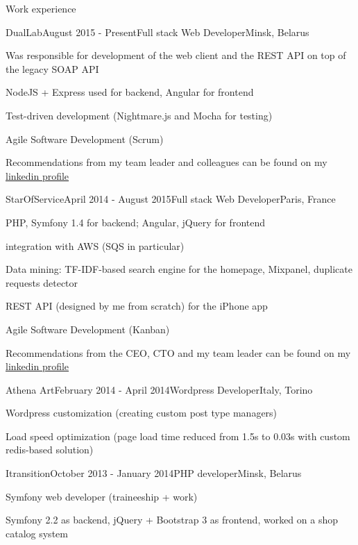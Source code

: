 \documentclass{resume} %
\begin{document}

\begin{rSection}{Work experience}

\begin{rSubsection}{DualLab}{August 2015 - Present}{Full stack Web Developer}{Minsk, Belarus}
\item Was responsible for development of the web client and the REST API on top of the legacy SOAP API
\item NodeJS + Express used for backend, Angular for frontend 
\item Test-driven development (Nightmare.js and Mocha for testing)
\item Agile Software Development (Scrum)
\item Recommendations from my team leader and colleagues can be found on my \href{http://linkedin.com/in/mikhalchenkoa}{linkedin profile}
\end{rSubsection}


\begin{rSubsection}{StarOfService}{April 2014 - August 2015}{Full stack Web Developer}{Paris, France}
\item PHP, Symfony 1.4 for backend; Angular, jQuery for frontend
\item integration with AWS (SQS in particular)
\item Data mining: TF-IDF-based search engine for the homepage, Mixpanel, duplicate requests detector
\item REST API (designed by me from scratch) for the iPhone app 
\item Agile Software Development (Kanban)
\item Recommendations from the CEO, CTO and my team leader can be found on my \href{http://linkedin.com/in/mikhalchenkoa}{linkedin profile}
\end{rSubsection}

\begin{rSubsection}{Athena Art}{February 2014 - April 2014}{Wordpress Developer}{Italy, Torino}
\item Wordpress customization (creating custom post type managers)
\item Load speed optimization (page load time reduced from 1.5s to 0.03s with custom redis-based solution)
\end{rSubsection}

\begin{rSubsection}{Itransition}{October 2013 - January 2014}{PHP developer}{Minsk, Belarus}
\item Symfony web developer (traineeship + work)
\item Symfony 2.2 as backend, jQuery + Bootstrap 3 as frontend, worked on a shop catalog system
\end{rSubsection}

\end{rSection}
\end{document}
